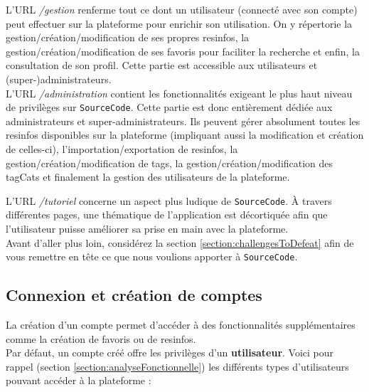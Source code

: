 L'URL \textit{/gestion} renferme tout ce dont un utilisateur (connecté avec son compte) peut effectuer sur la plateforme pour enrichir son utilisation. On y répertorie la gestion/création/modification de ses propres \glspl{resinfo}, la gestion/création/modification de ses favoris pour faciliter la recherche et enfin, la consultation de son profil. Cette partie est accessible aux utilisateurs et (super-)administrateurs.\\

L'URL \textit{/administration} contient les fonctionnalités exigeant le plus haut niveau de privilèges sur \texttt{SourceCode}. Cette partie est donc entièrement dédiée aux administrateurs et super-administrateurs. Ils peuvent gérer absolument toutes les \glspl{resinfo} disponibles sur la plateforme (impliquant aussi la modification et création de celles-ci), l'importation/exportation de \glspl{resinfo}, la gestion/création/modification de \glspl{tag}, la gestion/création/modification des \glspl{tagCat} et finalement la gestion des utilisateurs de la plateforme.\\

\pagebreak

L'URL \textit{/tutoriel} concerne un aspect plus ludique de \texttt{SourceCode}. À travers différentes pages, une thématique de l'application est décortiquée afin que l'utilisateur puisse améliorer sa prise en main avec la plateforme.\\

Avant d'aller plus loin, considérez la section \ref{section:challengesToDefeat} afin de vous remettre en tête ce que nous voulions apporter à \texttt{SourceCode}.

\subsection{Connexion et création de comptes}

La création d'un compte permet d'accéder à des fonctionnalités supplémentaires comme la création de favoris ou de \glspl{resinfo}.\\

Par défaut, un compte créé offre les privilèges d'un \textbf{utilisateur}. Voici pour rappel (section \ref{section:analyseFonctionnelle}) les différents types d'utilisateurs pouvant accéder à la plateforme :

